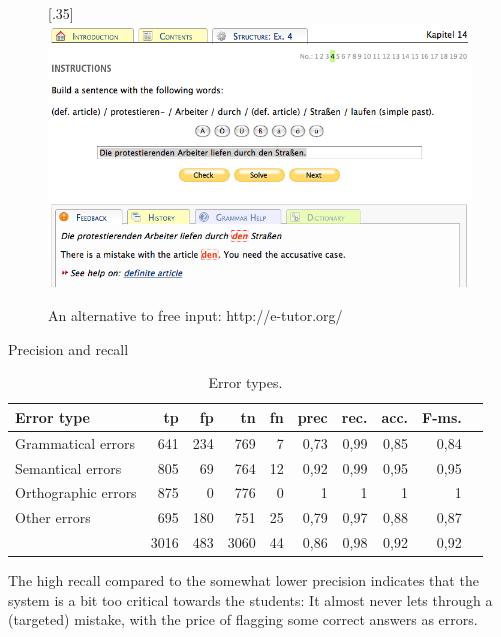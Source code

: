 \documentclass[11pt]{article}
\begin{document}
\begin{figure}[htbp]
\begin{center}
\scalebox{.35}[.35]{\includegraphics{presentation/img/e-tutor.png}}\\
\caption{An alternative to free input: http://e-tutor.org/}
\end{center}
\end{figure}
 
Precision and recall
\begin{table}[htbp]
\begin{center}
\begin{tabular}{|l|r|r|r|r||r|r|r|r|r|}
\hline
Error type	& tp		& fp		& tn		& fn	& prec	 & rec.	& acc.	& F-ms. \\
\hline
Grammatical errors    &   641   &   234   &   769    &   7    &   0,73   &   0,99   &   0,85   &   0,84	  \\
Semantical errors       &   805   &   69    &   764    &   12   &   0,92   &   0,99   &   0,95   &   0,95		  \\
Orthographic errors      &   875   &   0     &   776    &   0    &   1      &   1      &   1      &   1					  \\
Other errors     &   695   &   180   &   751    &   25   &   0,79   &   0,97   &   0,88   &   0,87	  \\
\hline
  &   3016  &   483   &   3060   &   44   &   0,86   &   0,98   &   0,92   &   0,92			  \\
\hline
\end{tabular}
\caption{Error types.}
\label{errortypes}
\end{center}
\end{table}%

The high recall compared to the somewhat lower precision indicates that the system is a bit too critical towards the students:
It almost never lets through a (targeted) mistake, with the price of flagging some correct answers as errors.
 
\end{document}
